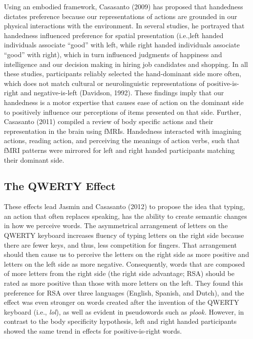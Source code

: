 \documentclass[english,man]{apa6}
\theoremstyle{definition}
\theoremstyle{definition}
\theoremstyle{definition}
\theoremstyle{remark}
\begin{document}
Using an embodied framework, Casasanto (2009) has proposed that
handedness dictates preference because our representations of actions
are grounded in our physical interactions with the environment. In
several studies, he portrayed that handedness influenced preference for
spatial presentation (i.e.,left handed individuals associate
\enquote{good} with left, while right handed individuals associate
\enquote{good} with right), which in turn influenced judgments of
happiness and intelligence and our decision making in hiring job
candidates and shopping. In all these studies, participants reliably
selected the hand-dominant side more often, which does not match
cultural or neurolinguistic representations of positive-is-right and
negative-is-left (Davidson, 1992). These findings imply that our
handedness is a motor expertise that causes ease of action on the
dominant side to positively influence our perceptions of items presented
on that side. Further, Casasanto (2011) compiled a review of body
specific actions and their representation in the brain using fMRIs.
Handedness interacted with imagining actions, reading action, and
perceiving the meanings of action verbs, such that fMRI patterns were
mirrored for left and right handed participants matching their dominant
side.

\subsection{The QWERTY Effect}\label{the-qwerty-effect}

These effects lead Jasmin and Casasanto (2012) to propose the idea that
typing, an action that often replaces speaking, has the ability to
create semantic changes in how we perceive words. The asymmetrical
arrangement of letters on the QWERTY keyboard increases fluency of
typing letters on the right side because there are fewer keys, and thus,
less competition for fingers. That arrangement should then cause us to
perceive the letters on the right side as more positive and letters on
the left side as more negative. Consequently, words that are composed of
more letters from the right side (the right side advantage; RSA) should
be rated as more positive than those with more letters on the left. They
found this preference for RSA over three languages (English, Spanish,
and Dutch), and the effect was even stronger on words created after the
invention of the QWERTY keyboard (i.e., \emph{lol}), as well as evident
in pseudowords such as \emph{plook.} However, in contrast to the body
specificity hypothesis, left and right handed participants showed the
same trend in effects for positive-is-right words.
\end{document}
